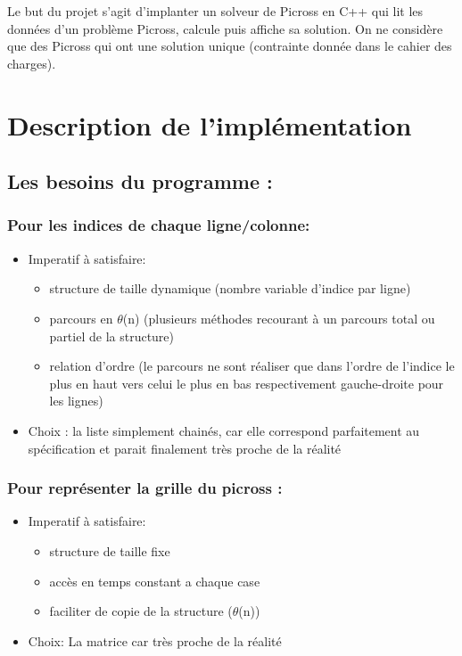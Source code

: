 \documentclass{article}
\begin{document}
Le but du projet s'agit d'implanter un solveur de Picross en C++ qui lit les donn\'ees d'un probl\`eme Picross, calcule puis affiche sa solution. On ne consid\`ere que des Picross qui ont une solution unique (contrainte donn\'ee dans le cahier des charges).





\section{Description de l'impl\'ementation}
\subsection{ Les besoins du programme :}

\subsubsection{Pour les indices de chaque ligne/colonne:}
\begin{itemize}
\item Imperatif \`a satisfaire:
\begin{itemize}

\item structure de taille dynamique (nombre variable d’indice par ligne)
\item parcours en $\theta$(n) (plusieurs m\'ethodes recourant \`a  un parcours total ou partiel de la structure)
\item relation d’ordre (le parcours ne sont r\'ealiser que dans l’ordre de l’indice le plus en haut vers celui le plus en bas respectivement gauche-droite pour les
lignes)
\end{itemize}
\item Choix : la liste simplement chain\'es, car elle correspond parfaitement au sp\'ecification et parait finalement tr\`es proche de la r\'ealit\'e
\end{itemize}
\subsubsection{Pour repr\'esenter la grille du picross :}
\begin{itemize}
\item Imperatif \`a satisfaire:
\begin{itemize}
\item structure de taille fixe
\item acc\`es en temps constant a chaque case
\item faciliter de copie de la structure ($\theta$(n))
\end{itemize}
\item Choix: La matrice car tr\`es proche de la r\'ealit\'e
\end{itemize}
\end{document}
